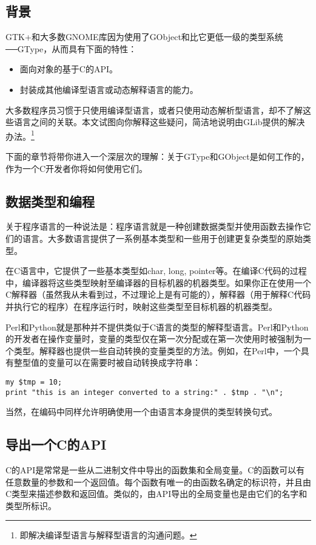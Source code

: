 \begin{CJK}{UTF8}{hei}
\chapter{背景}
\end{CJK}
GTK+和大多数GNOME库因为使用了GObject和比它更低一级的类型系统──GType，从而具有下面的特性：
\begin{itemize}
	\item 面向对象的基于C的API。
	\item 封装成其他编译型语言或动态解释语言的能力。
\end{itemize}
大多数程序员习惯于只使用编译型语言，或者只使用动态解析型语言，却不了解这些语言之间的关联。本文试图向你解释这些疑问，简洁地说明由GLib提供的解决办法。\footnote{即解决编译型语言与解释型语言的沟通问题。}

下面的章节将带你进入一个深层次的理解：关于GType和GObject是如何工作的，作为一个C开发者你将如何使用它们。
\begin{CJK}{UTF8}{hei}
\section{数据类型和编程}
\end{CJK}
关于程序语言的一种说法是：程序语言就是一种创建数据类型并使用函数去操作它们的语言。大多数语言提供了一系例基本类型和一些用于创建更复杂类型的原始类型。

在C语言中，它提供了一些基本类型如char, long, pointer等。在编译C代码的过程中，编译器将这些类型映射至编译器的目标机器的机器类型。如果你正在使用一个C解释器（虽然我从未看到过，不过理论上是有可能的），解释器（用于解释C代码并执行它的程序）在程序运行时，映射这些类型至目标机器的机器类型。

Perl和Python就是那种并不提供类似于C语言的类型的解释型语言。Perl和Python的开发者在操作变量时，变量的类型仅在第一次分配或在第一次使用时被强制为一个类型。解释器也提供一些自动转换的变量类型的方法。例如，在Perl中，一个具有整型值的变量可以在需要时被自动转换成字符串：


\begin{verbatim}
my $tmp = 10;
print "this is an integer converted to a string:" . $tmp . "\n";
\end{verbatim}

当然，在编码中同样允许明确使用一个由语言本身提供的类型转换句式。
\section{导出一个C的API}
C的API是常常是一些从二进制文件中导出的函数集和全局变量。C的函数可以有任意数量的参数和一个返回值。每个函数有唯一的由函数名确定的标识符，并且由C类型来描述参数和返回值。类似的，由API导出的全局变量也是由它们的名字和类型所标识。


